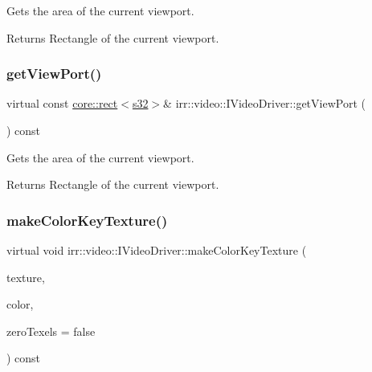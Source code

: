 Gets the area of the current viewport. 

\begin{DoxyReturn}{Returns}
Rectangle of the current viewport. 
\end{DoxyReturn}
\mbox{\label{classirr_1_1video_1_1IVideoDriver_aa21810374736559e937fcad30ac699b4}} 
\subsubsection{\texorpdfstring{get\+View\+Port()}{getViewPort()}\hspace{0.1cm}{\footnotesize\ttfamily [2/2]}}
{\footnotesize\ttfamily virtual const \hyperlink{classirr_1_1core_1_1rect}{core\+::rect}$<$\hyperlink{namespaceirr_ac66849b7a6ed16e30ebede579f9b47c6}{s32}$>$\& irr\+::video\+::\+I\+Video\+Driver\+::get\+View\+Port (\begin{DoxyParamCaption}{ }\end{DoxyParamCaption}) const\hspace{0.3cm}{\ttfamily [pure virtual]}}



Gets the area of the current viewport. 

\begin{DoxyReturn}{Returns}
Rectangle of the current viewport. 
\end{DoxyReturn}
\mbox{\label{classirr_1_1video_1_1IVideoDriver_a701e7d2101eb26888f57928134bc2ffb}} 
\subsubsection{\texorpdfstring{make\+Color\+Key\+Texture()}{makeColorKeyTexture()}\hspace{0.1cm}{\footnotesize\ttfamily [1/4]}}
{\footnotesize\ttfamily virtual void irr\+::video\+::\+I\+Video\+Driver\+::make\+Color\+Key\+Texture (\begin{DoxyParamCaption}\item[{\hyperlink{classirr_1_1video_1_1ITexture}{video\+::\+I\+Texture} $\ast$}]{texture,  }\item[{\hyperlink{classirr_1_1video_1_1SColor}{video\+::\+S\+Color}}]{color,  }\item[{bool}]{zero\+Texels = {\ttfamily false} }\end{DoxyParamCaption}) const\hspace{0.3cm}{\ttfamily [pure virtual]}}



